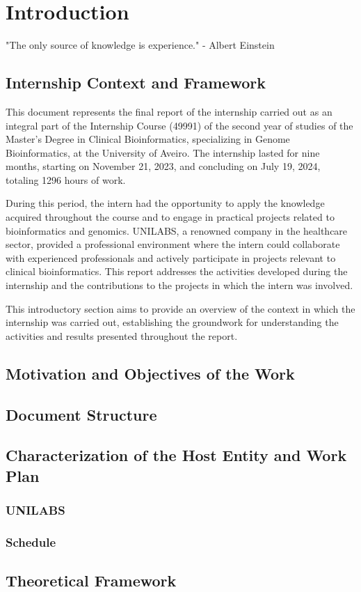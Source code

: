 \chapter{Introduction}
\label{chapter:introduction}

\begin{introduction}
    "The only source of knowledge is experience." - Albert Einstein
\end{introduction}



\section{Internship Context and Framework}

This document represents the final report of the internship carried out as an integral part of the Internship Course (49991) of the second year of studies of the Master's Degree in Clinical Bioinformatics, specializing in Genome Bioinformatics, at the University of Aveiro. The internship lasted for nine months, starting on November 21, 2023, and concluding on July 19, 2024, totaling 1296 hours of work.

During this period, the intern had the opportunity to apply the knowledge acquired throughout the course and to engage in practical projects related to bioinformatics and genomics. UNILABS, a renowned company in the healthcare sector, provided a professional environment where the intern could collaborate with experienced professionals and actively participate in projects relevant to clinical bioinformatics. This report addresses the activities developed during the internship and the contributions to the projects in which the intern was involved.

This introductory section aims to provide an overview of the context in which the internship was carried out, establishing the groundwork for understanding the activities and results presented throughout the report.


\section{Motivation and Objectives of the Work}
\section{Document Structure}
\section{Characterization of the Host Entity and Work Plan}
\subsection{UNILABS}
\subsection{Schedule}
\section{Theoretical Framework}